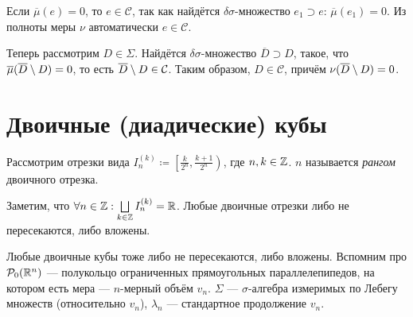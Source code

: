 \documentclass[a4paper]{report}
\begin{document}
{{        Если $\overline{\mu}(e) = 0$, то $e \in \mathcal{C}$, так как найдётся $\delta\sigma$-множество $e_1 \supset e$: $\overline{\mu}(e_1) = 0$.
        Из полноты меры $\nu$ автоматически $e \in \mathcal{C}$.

        Теперь рассмотрим $D \in \Sigma$. Найдётся $\delta\sigma$-множество $\overline{D} \supset D$, такое, что $\overline{\mu}(\overline{D}\setminus D) = 0$, то есть $\overline{D}\setminus D \in \mathcal{C}$.
        Таким образом, $D \in \mathcal{C}$, причём $\nu(\overline{D} \setminus D) = 0$.
    }
    }


    \section{Двоичные (диадические) кубы}
    Рассмотрим отрезки вида $I_n^{(k)} \coloneqq \left[\frac{k}{2^n}, \frac{k + 1}{2^n}\right)$, где $n,k \in \mathbb{Z}$.
    $n$ называется \emph{рангом} двоичного отрезка.

    Заметим, что $\forall n \in \mathbb{Z}: \bigsqcup\limits_{k \in \mathbb{Z}}I_n^{(k)} = \mathbb{R}$.
    Любые двоичные отрезки либо не пересекаются, либо вложены.

    Любые двоичные кубы тоже либо не пересекаются, либо вложены.
    Вспомним про $\mathcal{P}_0(\mathbb{R}^n)$ --- полукольцо ограниченных прямоугольных параллелепипедов, на котором есть мера --- $n$-мерный объём $v_n$.
    $\Sigma$ --- $\sigma$-алгебра измеримых по Лебегу множеств (относительно $v_n$), $\lambda_n$ --- стандартное продолжение $v_n$.
\end{document}
